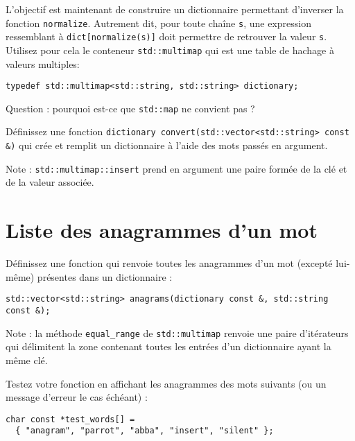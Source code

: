 \documentclass[a4paper]{article}
\begin{document}
L'objectif est maintenant de construire un dictionnaire permettant
d'inverser la fonction \lstinline|normalize|. Autrement dit, pour toute
chaîne \lstinline|s|, une expression ressemblant
à \lstinline|dict[normalize(s)]| doit permettre de retrouver la valeur
\lstinline|s|. Utilisez pour cela le conteneur
\lstinline|std::multimap| qui est une table de hachage à valeurs multiples:
\begin{lstlisting}
typedef std::multimap<std::string, std::string> dictionary;
\end{lstlisting}

Question : pourquoi est-ce que \lstinline|std::map| ne convient pas ?

Définissez une fonction
\lstinline|dictionary convert(std::vector<std::string> const &)| qui crée
et remplit un dictionnaire à l'aide des mots passés en argument.

Note : \lstinline|std::multimap::insert| prend en argument une
paire formée de la clé et de la valeur associée.

\section{Liste des anagrammes d'un mot}

Définissez une fonction qui renvoie toutes les anagrammes d'un mot (excepté
lui-même) présentes dans un dictionnaire :
\begin{lstlisting}
std::vector<std::string> anagrams(dictionary const &, std::string const &);
\end{lstlisting}

Note : la méthode \lstinline|equal_range| de
\lstinline|std::multimap| renvoie une paire d'itérateurs qui
délimitent la zone contenant toutes les entrées d'un dictionnaire ayant
la même clé.

Testez votre fonction en affichant les anagrammes des mots suivants (ou
un message d'erreur le cas échéant) :
\begin{lstlisting}
char const *test_words[] =
  { "anagram", "parrot", "abba", "insert", "silent" };
\end{lstlisting}
\end{document}
